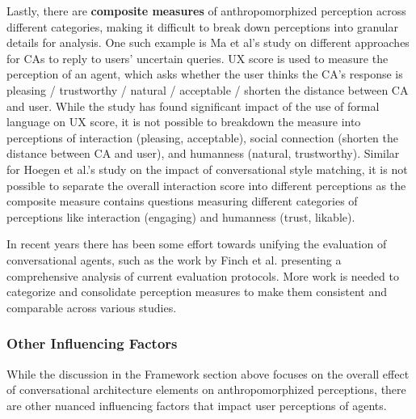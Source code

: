 \documentclass[sigconf,screen,review, anonymous]{acmart}
\newcommand{\cmt}[1]{}%
\begin{document}
Lastly, there are \textbf{composite measures} of anthropomorphized perception across different categories, making it difficult to break down perceptions into granular details for analysis. One such example is Ma et al's study \cite{ma2022ask}\cmt{[29]} on different approaches for CAs to reply to users' uncertain queries. UX score is used to measure the perception of an agent, which asks whether the user thinks the CA's response is pleasing / trustworthy / natural / acceptable / shorten the distance between CA and user. While the study has found significant impact of the use of formal language on UX score, it is not possible to breakdown the measure into perceptions of interaction (pleasing, acceptable), social connection (shorten the distance between CA and user), and humanness (natural, trustworthy). Similar for Hoegen et al.'s study \cite{hoegen2019end}\cmt{[31]} on the impact of conversational style matching, it is not possible to separate the overall interaction score into different perceptions as the composite measure contains questions measuring different categories of perceptions like interaction (engaging) and humanness (trust, likable).

In recent years there has been some effort towards unifying the evaluation of conversational agents, such as the work by Finch et al. \cite{finch2020towards} presenting a comprehensive analysis of current evaluation protocols. More work is needed to categorize and consolidate perception measures to make them consistent and comparable across various studies. 



\subsubsection{Other Influencing Factors}

While the discussion in the Framework section above focuses on the overall effect of conversational architecture elements on anthropomorphized perceptions,  there are other nuanced influencing factors that impact user perceptions of agents. 
\end{document}
